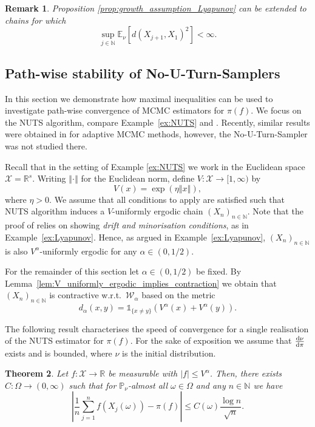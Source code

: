 \documentclass[12pt]{article}
\theoremstyle{plain}
\newtheorem{thm}{Theorem}[section]
\newtheorem{rem}[thm]{Remark}
\renewcommand{\d}{{\rm d}}
\newcommand{\norm}[1]{\left\Vert #1 \right\Vert}
\newcommand{\N}{\mathbb{N}}
\newcommand{\E}{\mathbb{E}}
\newcommand{\R}{\mathbb{R}}
\newcommand{\cX}{\mathcal{X}}
\begin{document}
{\begin{rem}
Proposition \ref{prop:growth_assumption_Lyapunov} can be extended to chains for which 
\[
\sup_{j \in \N}
\E_\nu[ d(X_{j+1}, X_1)^2 ] < \infty.
\]
\end{rem}
\subsection{Path-wise stability of No-U-Turn-Samplers}
In this section we demonstrate how maximal inequalities can be used to investigate path-wise convergence of MCMC estimators for $\pi(f)$. 
We focus on the NUTS algorithm, compare Example~\ref{ex:NUTS} and \cite{hoffman2014no,durmus2023convergence}. 
Recently, similar results were obtained in \cite{hofstadler2024convergenceRates} for adaptive MCMC methods, however, the No-U-Turn-Sampler was not studied there.

Recall that in the setting of Example \ref{ex:NUTS} we work in the Euclidean space $\cX = \R^s$. 
Writing $\norm{\cdot}$ for the Euclidean norm, define $V \colon \cX \to [1, \infty)$ by 
\[
V(x) = \exp (\eta \norm{x}),
\]
where $\eta>0$.
We assume that all conditions to apply \cite[Theorem 17]{durmus2023convergence} are satisfied such that NUTS algorithm induces a $V$-uniformly ergodic chain $(X_n)_{n \in \N}$. 
Note that the proof of \cite[Theorem 17]{durmus2023convergence} relies on showing \textit{drift and minorisation conditions}, as in Example~\ref{ex:Lyapunov}. 
Hence, as argued in Example~\ref{ex:Lyapunov}, $(X_n)_{n \in \N}$ is also $V^\alpha$-uniformly ergodic for any $\alpha \in (0,1/2)$. 

For the remainder of this section let $\alpha \in (0, 1/2)$ be fixed. 
By Lemma~\ref{lem:V_uniformly_ergodic_implies_contraction} we obtain that $(X_n)_{n \in \N}$ is contractive w.r.t.~$\mathcal{W}_\alpha$ based on the metric 
\[
d_\alpha(x,y) = \mathds{1}_{\{x \neq y\}} (V^\alpha(x) + V^\alpha(y)). 
\]

The following result characterises the speed of convergence for a single realisation of the NUTS estimator for $\pi(f)$. 
For the sake of exposition we assume that $\frac{\d \nu}{\d \pi}$ exists and is bounded, where $\nu$ is the initial distribution.   
\begin{thm}\label{thm:almost_sure_convergence_NUTS}
Let $f \colon \cX \to \R$ be measurable with $\vert f \vert \leq V^\alpha$. 
Then, there exists $C \colon \Omega \to (0, \infty)$ such that for $\mathbb{P}_\nu$-almost all $\omega \in \Omega$ and any $n \in \N$ we have 
\[
\left\vert \frac{1}{n}\sum_{j=1}^n f(X_j(\omega)) - \pi(f) \right\vert \leq C(\omega) \frac{\log n}{\sqrt{n}} .
\]
\end{thm}

}
\end{document}
